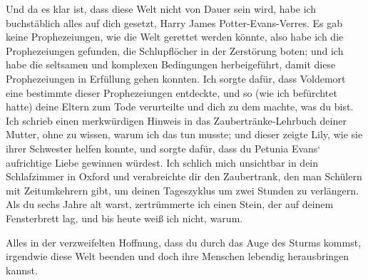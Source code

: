 \begin{writtenNote}
Und da es klar ist, dass diese Welt nicht von Dauer sein wird, habe ich buchstäblich alles auf dich gesetzt, Harry James Potter-Evans-Verres. Es gab keine Prophezeiungen, wie die Welt gerettet werden könnte, also habe ich die Prophezeiungen gefunden, die Schlupflöcher in der Zerstörung boten; und ich habe die seltsamen und komplexen Bedingungen herbeigeführt, damit diese Prophezeiungen in Erfüllung gehen konnten.
Ich sorgte dafür, dass Voldemort eine bestimmte dieser Prophezeiungen entdeckte, und so (wie ich befürchtet hatte) deine Eltern zum Tode verurteilte und dich zu dem machte, was du bist.
Ich schrieb einen merkwürdigen Hinweis in das Zaubertränke-Lehrbuch deiner Mutter, ohne zu wissen, warum ich das tun musste; und dieser zeigte Lily, wie sie ihrer Schwester helfen konnte, und sorgte dafür, dass du Petunia Evans‘ aufrichtige Liebe gewinnen würdest.
Ich schlich mich unsichtbar in dein Schlafzimmer in Oxford und verabreichte dir den Zaubertrank, den man Schülern mit Zeitumkehrern gibt, um deinen Tageszyklus um zwei Stunden zu verlängern.
Als du sechs Jahre alt warst, zertrümmerte ich einen Stein, der auf deinem Fensterbrett lag, und bis heute weiß ich nicht, warum.

Alles in der verzweifelten Hoffnung, dass du durch das Auge des Sturms kommst, irgendwie diese Welt beenden und doch ihre Menschen lebendig herausbringen kannst.


\end{writtenNote}
